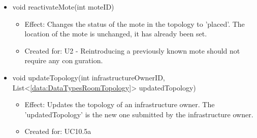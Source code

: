 \begin{description}
\begin{itemize}[noitemsep,nolistsep,leftmargin=-.25cm]
      \item \textsf{void reactivateMote(int moteID)}
        \begin{itemize}[noitemsep,nolistsep]
           \item Effect: Changes the status of the mote in the topology to 'placed'. The location of the mote is unchanged, it has already been set.
\item Created for: U2 - Reintroducing a previously known mote should not require any conguration.
        \end{itemize}
      \item \textsf{void updateTopology(int infrastructureOwnerID, List\textless{}\ref{data:DataTypesRoomTopology}\textgreater{} updatedTopology)}
        \begin{itemize}[noitemsep,nolistsep]
           \item Effect: Updates the topology of an infrastructure owner. The 'updatedTopology' is the new one submitted by the infrastructure owner.
\item Created for: UC10.5a
        \end{itemize}
    \end{itemize}
    \end{description}

